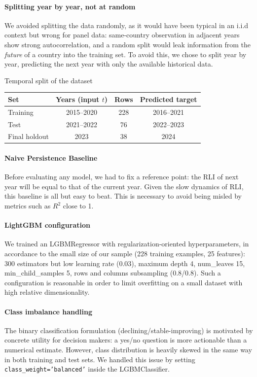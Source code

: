 \paragraph{Splitting year by year, not at random} We avoided splitting the data randomly, as it would have been typical in an i.i.d context but wrong for panel data: same-country observation in adjacent years show strong autocorrelation, and a random split would leak information from the \textit{future} of a country into the training set. To avoid this, we chose to split year by year, predicting the next year with only the available historical data.

\begin{center}
Temporal split of the dataset
\vspace{4pt}

\begin{tabular}{lccc}
\toprule
Set & Years (input $t$) & Rows & Predicted target \\
\midrule
Training      & 2015--2020 & 228 & 2016--2021 \\
Test           & 2021--2022 & 76  & 2022--2023 \\
Final holdout  & 2023       & 38  & 2024 \\
\bottomrule
\end{tabular}
\end{center}

\paragraph{Naive Persistence Baseline} Before evaluating any model, we had to fix a reference point: the RLI of next year will be equal to that of the current year. Given the slow dynamics of RLI, this baseline is all but easy to beat. This is necessary to avoid being misled by metrics such as $R^2$ close to 1.

\paragraph{LightGBM configuration} We trained an LGBMRegressor with regularization-oriented hyperparameters, in accordance to the small size of our sample (228 training examples, 25 features): 300 estimators but low learning rate (0.03), maximum depth 4, num\_leaves 15, min\_child\_samples 5, rows and columns subsampling (0.8/0.8). Such a configuration is reasonable in order to limit overfitting on a small dataset with high relative dimensionality.

\paragraph{Class imbalance handling} The binary classification formulation (declining/stable-improving) is motivated by concrete utility for decision makers: a yes/no question is more actionable than a numerical estimate. However, class distribution is heavily skewed in the same way in both training and test sets. We handled this issue by setting \texttt{class\_weight='balanced'} inside the LGBMClassifier.

